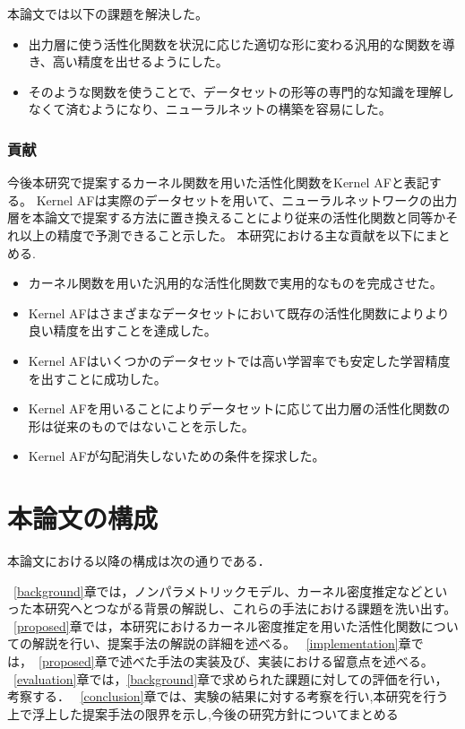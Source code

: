 本論文では以下の課題を解決した。
\begin{itemize}
  \item 出力層に使う活性化関数を状況に応じた適切な形に変わる汎用的な関数を導き、高い精度を出せるようにした。
  \item そのような関数を使うことで、データセットの形等の専門的な知識を理解しなくて済むようになり、ニューラルネットの構築を容易にした。
\end{itemize}

\subsubsection{貢献}

今後本研究で提案するカーネル関数を用いた活性化関数をKernel AFと表記する。
Kernel AFは実際のデータセットを用いて、ニューラルネットワークの出力層を本論文で提案する方法に置き換えることにより従来の活性化関数と同等かそれ以上の精度で予測できること示した。
本研究における主な貢献を以下にまとめる.

\begin{itemize}
  \item カーネル関数を用いた汎用的な活性化関数で実用的なものを完成させた。
  \item Kernel AFはさまざまなデータセットにおいて既存の活性化関数によりより良い精度を出すことを達成した。
  \item Kernel AFはいくつかのデータセットでは高い学習率でも安定した学習精度を出すことに成功した。
  \item Kernel AFを用いることによりデータセットに応じて出力層の活性化関数の形は従来のものではないことを示した。
  \item Kernel AFが勾配消失しないための条件を探求した。
\end{itemize}


\section{本論文の構成}

本論文における以降の構成は次の通りである．

~\ref{background}章では，ノンパラメトリックモデル、カーネル密度推定などといった本研究へとつながる背景の解説し、これらの手法における課題を洗い出す。
~\ref{proposed}章では，本研究におけるカーネル密度推定を用いた活性化関数についての解説を行い、提案手法の解説の詳細を述べる。
~\ref{implementation}章では，~\ref{proposed}章で述べた手法の実装及び、実装における留意点を述べる。
~\ref{evaluation}章では，\ref{background}章で求められた課題に対しての評価を行い，考察する．
~\ref{conclusion}章では、実験の結果に対する考察を行い,本研究を行う上で浮上した提案手法の限界を示し,今後の研究方針についてまとめる






